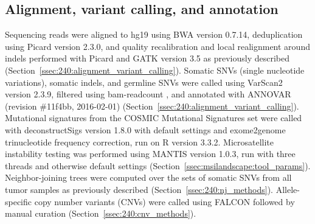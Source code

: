 \subsection{Alignment, variant calling, and annotation}
\label{ssec:303:align_vars_anno}
Sequencing reads were aligned to hg19 using BWA \cite{bwa} version 0.7.14, deduplication using Picard \cite{Picard2019toolkit} version 2.3.0, and quality recalibration and local realignment around indels performed with Picard and GATK \cite{mckenna10} version 3.5 as previously described (Section~\ref{ssec:240:alignment_variant_calling}). Somatic SNVs (single nucleotide variations), somatic indels, and germline SNVs were called using VarScan2 \cite{varscan2} version 2.3.9, filtered using bam-readcount \cite{bamreadcount}, and annotated with ANNOVAR \cite{annovar} (revision \#11f4bb, 2016-02-01) (Section~\ref{ssec:240:alignment_variant_calling}). Mutational signatures from the COSMIC Mutational Signatures set \cite{cosmic_ms} were called with deconstructSigs \cite{rosenthal16} version 1.8.0 with default settings and exome2genome trinucleotide frequency correction, run on R version 3.3.2. Microsatellite instability testing was performed using MANTIS \cite{kautto17} version 1.0.3, run with three threads and otherwise default settings (Section~\ref{ssec:msilandscape:tool_params}). Neighbor-joining trees were computed over the sets of somatic SNVs from all tumor samples as previously described (Section~\ref{ssec:240:nj_methods}). Allele-specific copy number variants (CNVs) were called using FALCON \cite{falcon} followed by manual curation (Section~\ref{ssec:240:cnv_methods}).

